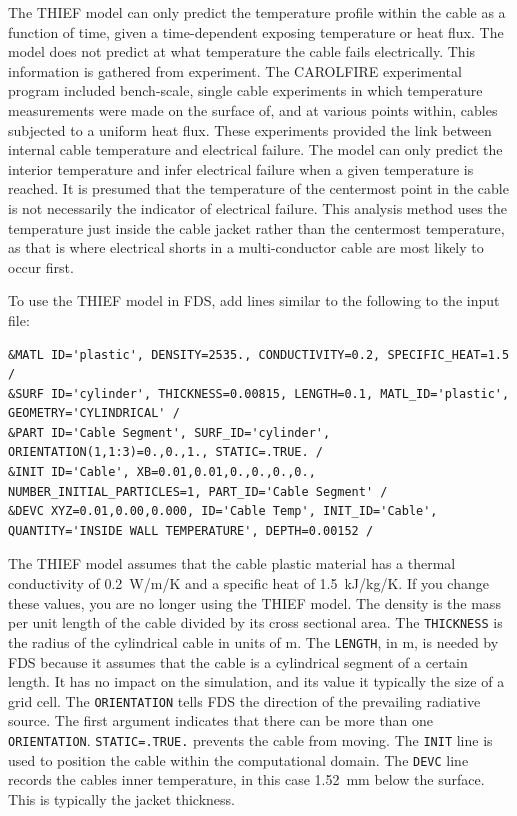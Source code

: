 \documentclass[11pt]{book}
\newcommand{\ct}{\tt\small}
\begin{document}
The THIEF model can only predict the temperature profile within the cable as a function of time,
given a time-dependent exposing temperature or heat flux. The model does not predict at what
temperature the cable fails electrically. This information is gathered from experiment. The
CAROLFIRE experimental program included bench-scale, single cable experiments in which
temperature measurements were made on the surface of, and at various points within, cables
subjected to a uniform heat flux. These experiments provided the link between internal cable
temperature and electrical failure. The model can only predict the interior temperature and infer
electrical failure when a given temperature is reached. It is presumed that the
temperature of the centermost point in the cable is not necessarily the indicator of electrical
failure. This analysis method uses the temperature just inside the cable jacket rather than the
centermost temperature, as that is where electrical shorts in a multi-conductor cable are most
likely to occur first.

To use the THIEF model in FDS, add lines similar to the following to the input file:

\footnotesize
\begin{verbatim}
&MATL ID='plastic', DENSITY=2535., CONDUCTIVITY=0.2, SPECIFIC_HEAT=1.5 /
&SURF ID='cylinder', THICKNESS=0.00815, LENGTH=0.1, MATL_ID='plastic', GEOMETRY='CYLINDRICAL' /
&PART ID='Cable Segment', SURF_ID='cylinder', ORIENTATION(1,1:3)=0.,0.,1., STATIC=.TRUE. /
&INIT ID='Cable', XB=0.01,0.01,0.,0.,0.,0., NUMBER_INITIAL_PARTICLES=1, PART_ID='Cable Segment' /
&DEVC XYZ=0.01,0.00,0.000, ID='Cable Temp', INIT_ID='Cable', QUANTITY='INSIDE WALL TEMPERATURE', DEPTH=0.00152 /
\end{verbatim}
\normalsize

\noindent
The THIEF model assumes that the cable plastic material has a thermal conductivity of 0.2~W/m/K and a specific heat of 1.5~kJ/kg/K. If you change these
values, you are no longer using the THIEF model. The density is the mass per unit length of the cable divided by its cross sectional area.
The {\ct THICKNESS} is the radius of the cylindrical cable in units of m. The {\ct LENGTH}, in m, is needed
by FDS because it assumes that the cable is a cylindrical segment of a certain length. It has no impact on the simulation, and its value it typically the size of a grid cell.
The {\ct ORIENTATION} tells FDS the direction of the prevailing radiative source. The first argument indicates that there can be more than one {\ct ORIENTATION}.
{\ct STATIC=.TRUE.} prevents the cable from moving. The {\ct INIT} line is used to position the cable within the computational domain.
The {\ct DEVC} line records the cables inner temperature, in this case 1.52~mm below the surface. This is typically the jacket thickness.
\end{document}
